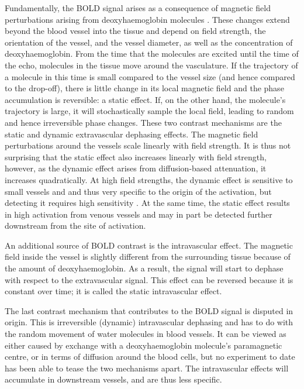 Fundamentally, the BOLD signal arises as a consequence of magnetic field perturbations arising from deoxyhaemoglobin molecules \cite{Norris2006}. These changes extend beyond the blood vessel into the tissue and depend on field strength, the orientation of the vessel, and the vessel diameter, as well as the concentration of deoxyhaemoglobin. From the time that the molecules are excited until the time of the echo, molecules in the tissue move around the vasculature. If the trajectory of a molecule in this time is small compared to the vessel size (and hence compared to the drop-off), there is little change in its local magnetic field and the phase accumulation is reversible: a static effect. If, on the other hand, the molecule's trajectory is large, it will stochastically sample the local field, leading to random and hence irreversible phase changes. These two contrast mechanisms are the static and dynamic extravascular dephasing effects. The magnetic field perturbations around the vessels scale linearly with field strength. It is thus not surprising that the static effect also increases linearly with field strength, however, as the dynamic effect arises from diffusion-based attenuation, it increases quadratically.  At high field strengths, the dynamic effect is sensitive to small vessels and  and thus very specific to the origin of the activation, but detecting it requires high sensitivity \cite{Panchuelo2014}. At the same time, the static effect results in high activation from venous vessels and may in part be detected further downstream from the site of activation. 

An additional source of BOLD contrast is the intravascular effect. The magnetic field inside the vessel is slightly different from the surrounding tissue because of the amount of deoxyhaemoglobin. As a result, the signal will start to dephase with respect to the extravascular signal. This effect can be reversed because it is constant over time; it is called the static intravascular effect. 

The last contrast mechanism that contributes to the BOLD signal is disputed in origin. This is irreversible (dynamic) intravascular dephasing and has to do with the random movement of water molecules in blood vessels. It can be viewed as either caused by exchange with a deoxyhaemoglobin molecule’s paramagnetic centre, or in terms of diffusion around the blood cells, but no experiment to date has been able to tease the two mechanisms apart. The intravascular effects will accumulate in downstream vessels,  and are thus less specific.

